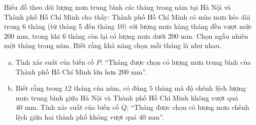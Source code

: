 \begin{bt}%
Biểu đồ theo dõi lượng mưa trung bình các tháng trong năm tại Hà Nội và Thành phố Hồ Chí Minh cho thấy: Thành phố Hồ Chí Minh có mùa mưa kéo dài trong $6$ tháng (từ tháng 5 đến tháng 10) với lượng mưa hàng tháng đều vượt mức $200\text{ mm}$, trong khi $6$ tháng còn lại có lượng mưa dưới $200\text{ mm}$. Chọn ngẫu nhiên một tháng trong năm. Biết rằng khả năng chọn mỗi tháng là như nhau.
\begin{enumerate}[a)]
    \item Tính xác suất của biến cố $P$: ``Tháng được chọn có lượng mưa trung bình của Thành phố Hồ Chí Minh lớn hơn $200\text{ mm}$''.
    \item Biết rằng trong $12$ tháng của năm, có đúng $5$ tháng mà độ chênh lệch lượng mưa trung bình giữa Hà Nội và Thành phố Hồ Chí Minh không vượt quá $40\text{ mm}$. Tính xác suất của biến cố $Q$: ``Tháng được chọn có lượng mưa chênh lệch giữa hai thành phố không vượt quá $40\text{ mm}$''.
\end{enumerate}
\end{bt}

